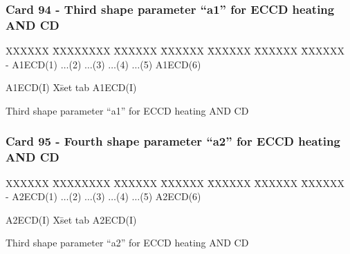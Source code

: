 \subsubsection{Card 94 -  Third shape parameter “a1” for ECCD heating AND CD}
\begin{tabbing}
XXXXXX \= XXXXXXXX \= XXXXXX \= XXXXXX \= XXXXXX \= XXXXXX \=
XXXXXX       \\
\footnotesize - \>\footnotesize  A1ECD(1) \>\footnotesize $\ldots$(2) \>\footnotesize
$\ldots$(3) \>\footnotesize $\ldots$(4) \>\footnotesize $\ldots$(5) \>\footnotesize A1ECD(6)
\\
\end{tabbing}
\begin{tabbing}
A1ECD(I) X\= set tab \kill
A1ECD(I) \> \parbox[t]{\width}{
Third shape parameter “a1” for ECCD heating AND CD
}
\end{tabbing}

\subsubsection{Card 95 -  Fourth shape parameter “a2” for ECCD heating AND CD}
\begin{tabbing}
XXXXXX \= XXXXXXXX \= XXXXXX \= XXXXXX \= XXXXXX \= XXXXXX \=
XXXXXX       \\
\footnotesize - \>\footnotesize  A2ECD(1) \>\footnotesize $\ldots$(2) \>\footnotesize
$\ldots$(3) \>\footnotesize $\ldots$(4) \>\footnotesize $\ldots$(5) \>\footnotesize A2ECD(6)
\\
\end{tabbing}
\begin{tabbing}
A2ECD(I) X\= set tab \kill
A2ECD(I) \> \parbox[t]{\width}{
Third shape parameter “a2” for ECCD heating AND CD
} 
\end{tabbing}


